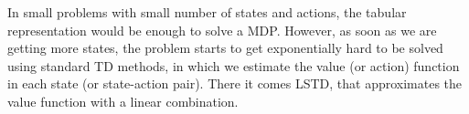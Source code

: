 \documentclass{article}
\theoremstyle{remark}
\theoremstyle{remark}
\theoremstyle{remark}
\theoremstyle{remark}
\theoremstyle{remark}
\theoremstyle{remark}
\begin{document}
In small problems with small number of states and actions, the tabular representation would be enough to solve a MDP. However, as soon as we are getting more states, the problem starts to get exponentially hard to be solved using standard TD methods, in which we estimate the value (or action) function in each state (or state-action pair). There it comes LSTD, that approximates the value function with a linear combination.





\end{document}
